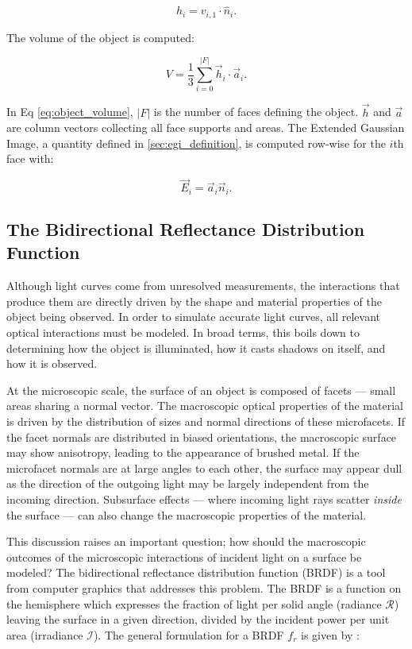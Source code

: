 \begin{equation} \label{eq:face_support}
    h_i = v_{i,1} \cdot \hat{n}_i.
\end{equation}

The volume of the object is computed:

\begin{equation} \label{eq:object_volume}
    V = \frac{1}{3} \sum_{i=0}^{ \lvert F \rvert}\vec{h}_i \cdot \vec{a}_i.
\end{equation}

In Eq \ref{eq:object_volume}, $\lvert F \rvert$ is the number of faces defining the object. $\vec{h}$ and $\vec{a}$ are column vectors collecting all face supports and areas. The Extended Gaussian Image, a quantity defined in \ref{sec:egi_definition}, is computed row-wise for the $i$th face with:

\begin{equation} \label{eq:egi_definition}
    \vec{E}_i = \vec{a}_i \vec{n}_i.
\end{equation}

\subsection{The Bidirectional Reflectance Distribution Function}

Although light curves come from unresolved measurements, the interactions that produce them are directly driven by the shape and material properties of the object being observed. In order to simulate accurate light curves, all relevant optical interactions must be modeled. In broad terms, this boils down to determining how the object is illuminated, how it casts shadows on itself, and how it is observed. 

At the microscopic scale, the surface of an object is composed of facets ---  small areas sharing a normal vector. The macroscopic optical properties of the material is driven by the distribution of sizes and normal directions of these microfacets. If the facet normals are distributed in biased orientations, the macroscopic surface may show anisotropy, leading to the appearance of brushed metal. If the microfacet normals are at large angles to each other, the surface may appear dull as the direction of the outgoing light may be largely independent from the incoming direction. Subsurface effects ---  where incoming light rays scatter \textit{inside} the surface --- can also change the macroscopic properties of the material. 

This discussion raises an important question; how should the macroscopic outcomes of the microscopic interactions of incident light on a surface be modeled? The bidirectional reflectance distribution function (BRDF) is a tool from computer graphics that addresses this problem. The BRDF is a function on the hemisphere which expresses the fraction of light per solid angle (radiance $\mathcal{R}$) leaving the surface in a given direction, divided by the incident power per unit area (irradiance $\mathcal{I}$). The general formulation for a BRDF $f_r$ is given by \cite{duvenhage2013}:


